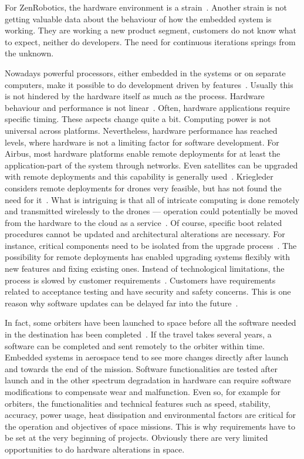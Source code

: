\documentclass[english]{tktltiki2}
\begin{document}
For ZenRobotics, the hardware environment is a strain~\cite{Hol15a}. Another strain is not getting valuable data about the behaviour of how the embedded system is working. They are working a new product segment, customers do not know what to expect, neither do developers. The need for continuous iterations springs from the unknown.

Nowadays powerful processors, either embedded in the systems or on separate computers, make it possible to do development driven by features~\cite{BT15, Koi15}. Usually this is not hindered by the hardware itself as much as the process. Hardware behaviour and performance is not linear~\cite{Hol15a}. Often, hardware applications require specific timing. These aspects change quite a bit. Computing power is not universal across platforms. Nevertheless, hardware performance has reached levels, where hardware is not a limiting factor for software development. For Airbus, most hardware platforms enable remote deployments for at least the application-part of the system through networks. Even satellites can be upgraded with remote deployments and this capability is generally used~\cite{Hol15b}. Kriegleder considers remote deployments for drones very feasible, but has not found the need for it~\cite{Kri15}. What is intriguing is that all of intricate computing is done remotely and transmitted wirelessly to the drones — operation could potentially be moved from the hardware to the cloud as a service~\cite{Kri15}. Of course, specific boot related procedures cannot be updated and architectural alterations are necessary. For instance, critical components need to be isolated from the upgrade process~\cite{Kri15}. The possibility for remote deployments has enabled upgrading systems flexibly with new features and fixing existing ones. Instead of technological limitations, the process is slowed by customer requirements~\cite{Hol15b, Koi15}. Customers have requirements related to acceptance testing and have security and safety concerns. This is one reason why software updates can be delayed far into the future~\cite{Koi15}.

In fact, some orbiters have been launched to space before all the software needed in the destination has been completed~\cite{Hol15b}. If the travel takes several years, a software can be completed and sent remotely to the orbiter within time. Embedded systems in aerospace tend to see more changes directly after launch and towards the end of the mission. Software functionalities are tested after launch and in the other spectrum degradation in hardware can require software modifications to compensate wear and malfunction. Even so, for example for orbiters, the functionalities and technical features such as speed, stability, accuracy, power usage, heat dissipation and environmental factors are critical for the operation and objectives of space missions. This is why requirements have to be set at the very beginning of projects. Obviously there are very limited opportunities to do hardware alterations in space.
\end{document}
